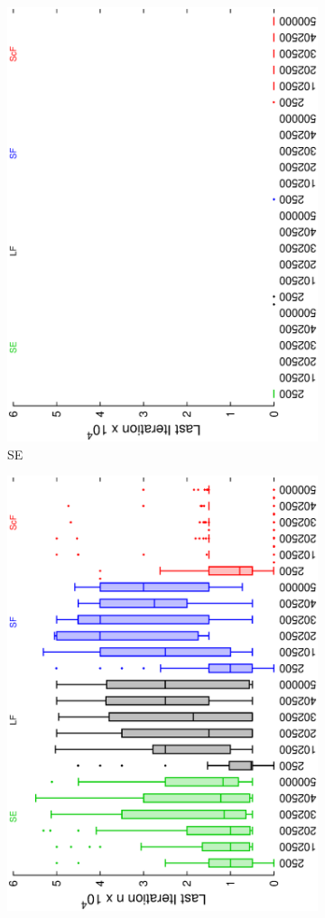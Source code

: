 \begin{figure}[h]
\begin{subfigure}{.25\textwidth}
 \centering
 \includegraphics[width=.7\linewidth, angle =-90]{img/boxendingsFailedstable.eps}
 \caption{SE}
 \label{fig:sfig1}
\end{subfigure}%
\begin{subfigure}{.25\textwidth}
 \centering
 \includegraphics[width=.7\linewidth, angle =-90]{img/boxendingsFailedvariation.eps}

\end{subfigure}
\end{figure}

